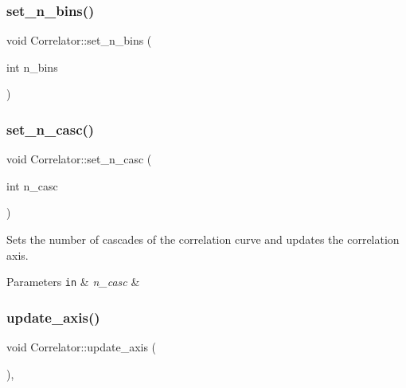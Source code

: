 \subsubsection{\texorpdfstring{set\+\_\+n\+\_\+bins()}{set\_n\_bins()}}
{\footnotesize\ttfamily void Correlator\+::set\+\_\+n\+\_\+bins (\begin{DoxyParamCaption}\item[{int}]{n\+\_\+bins }\end{DoxyParamCaption})\hspace{0.3cm}{\ttfamily [inline]}}

\mbox{\label{class_correlator_a8e96a0c2d5235e912965632b280da01b}} 
\subsubsection{\texorpdfstring{set\+\_\+n\+\_\+casc()}{set\_n\_casc()}}
{\footnotesize\ttfamily void Correlator\+::set\+\_\+n\+\_\+casc (\begin{DoxyParamCaption}\item[{int}]{n\+\_\+casc }\end{DoxyParamCaption})\hspace{0.3cm}{\ttfamily [inline]}}

Sets the number of cascades of the correlation curve and updates the correlation axis. 
\begin{DoxyParams}[1]{Parameters}
\mbox{\tt in}  & {\em n\+\_\+casc} & \\
\hline
\end{DoxyParams}
\mbox{\label{class_correlator_af4caefcd9465346248a5dc1949846f3e}} 
\subsubsection{\texorpdfstring{update\+\_\+axis()}{update\_axis()}}
{\footnotesize\ttfamily void Correlator\+::update\+\_\+axis (\begin{DoxyParamCaption}{ }\end{DoxyParamCaption})\hspace{0.3cm}{\ttfamily [inline]}, {\ttfamily [protected]}}

